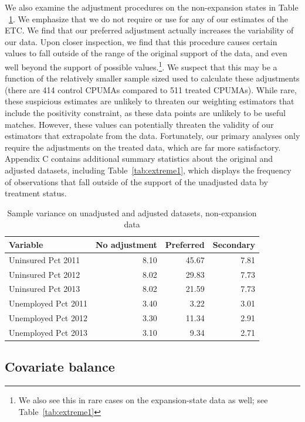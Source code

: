 We also examine the adjustment procedures on the non-expansion states in Table ~\ref{tab:adjust2}. We emphasize that we do not require or use for any of our estimates of the ETC. We find that our preferred adjustment actually increases the variability of our data. Upon closer inspection, we find that this procedure causes certain values to fall outside of the range of the original support of the data, and even well beyond the support of possible values.\footnote{We also see this in rare cases on the expansion-state data as well; see Table~\ref{tab:extreme1}}. We suspect that this may be a function of the relatively smaller sample sized used to calculate these adjustments (there are 414 control CPUMAs compared to 511 treated CPUMAs). While rare, these suspicious estimates are unlikely to threaten our weighting estimators that include the positivity constraint, as these data points are unlikely to be useful matches. However, these values can potentially threaten the validity of our estimators that extrapolate from the data. Fortunately, our primary analyses only require the adjustments on the treated data, which are far more satisfactory. Appendix C contains additional summary statistics about the original and adjusted datasets, including Table~\ref{tab:extreme1}, which displays the frequency of observations that fall outside of the support of the unadjusted data by treatment status.

\begin{table}[ht]
\caption{Sample variance on unadjusted and adjusted datasets, non-expansion data}
\label{tab:adjust2}
\begin{tabular}{lrrr}
  \hline
Variable & No adjustment & Preferred & Secondary \\ 
  \hline
Uninsured Pct 2011 & 8.10 & 45.67 & 7.81 \\ 
  Uninsured Pct 2012 & 8.02 & 29.83 & 7.73 \\ 
  Uninsured Pct 2013 & 8.02 & 21.59 & 7.73 \\ 
  Unemployed Pct 2011 & 3.40 & 3.22 & 3.01 \\ 
  Unemployed Pct 2012 & 3.30 & 11.34 & 2.91 \\ 
  Unemployed Pct 2013 & 3.10 & 9.34 & 2.71 \\ 
   \hline
\end{tabular}
\end{table}

\subsection{Covariate balance}

